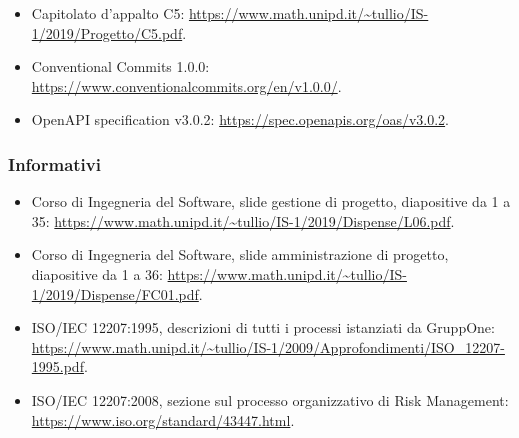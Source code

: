 \documentclass[../norme-di-progetto.tex]{subfiles}
\begin{document}
\begin{itemize}
  \item Capitolato d'appalto C5: \href{https://www.math.unipd.it/~tullio/IS-1/2019/Progetto/C5.pdf}{https://www.math.unipd.it/\textasciitilde tullio/IS-1/2019/Progetto/C5.pdf}.
  \item Conventional Commits 1.0.0: \href{https://www.conventionalcommits.org/en/v1.0.0/}{https://www.conventionalcommits.org/en/v1.0.0/}.
  \item OpenAPI specification v3.0.2: \href{https://spec.openapis.org/oas/v3.0.2}{https://spec.openapis.org/oas/v3.0.2}.
\end{itemize}

\subsubsection{Informativi}%
\label{subs:riferimenti/informativi}

\begin{itemize}
  \item Corso di Ingegneria del Software, slide gestione di progetto, diapositive da 1 a 35: \linebreak\href{https://www.math.unipd.it/~tullio/IS-1/2019/Dispense/L06.pdf}{https://www.math.unipd.it/\textasciitilde tullio/IS-1/2019/Dispense/L06.pdf}.
  \item Corso di Ingegneria del Software, slide amministrazione di progetto, diapositive da 1 a 36: \href{https://www.math.unipd.it/~tullio/IS-1/2019/Dispense/FC01.pdf}{https://www.math.unipd.it/\textasciitilde tullio/IS-1/2019/Dispense/FC01.pdf}.
  \item ISO/IEC 12207:1995, descrizioni di tutti i processi istanziati da GruppOne: \href{https://www.math.unipd.it/~tullio/IS-1/2009/Approfondimenti/ISO_12207-1995.pdf}{https://www.math.unipd.it/\textasciitilde tullio/IS-1/2009/Approfondimenti/ISO\_12207-1995.pdf}.
  \item ISO/IEC 12207:2008, sezione sul processo organizzativo di Risk Management: \href{https://www.iso.org/standard/43447.html}{https://www.iso.org/standard/43447.html}.
\end{itemize}
\end{document}
